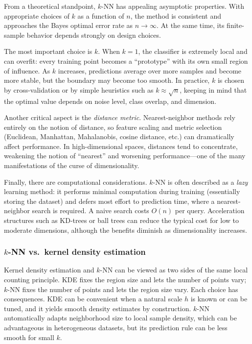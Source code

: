 From a theoretical standpoint, \(k\)-NN has appealing asymptotic properties. With appropriate choices of \(k\) as a function of \(n\), the method is consistent and approaches the Bayes optimal error rate as \(n\to\infty\). At the same time, its finite-sample behavior depends strongly on design choices.

The most important choice is \(k\). When \(k=1\), the classifier is extremely local and can overfit: every training point becomes a ``prototype'' with its own small region of influence. As \(k\) increases, predictions average over more samples and become more stable, but the boundary may become too smooth. In practice, \(k\) is chosen by cross-validation or by simple heuristics such as \(k\approx \sqrt{n}\), keeping in mind that the optimal value depends on noise level, class overlap, and dimension.

Another critical aspect is the \emph{distance metric}. Nearest-neighbor methods rely entirely on the notion of distance, so feature scaling and metric selection (Euclidean, Manhattan, Mahalanobis, cosine distance, etc.) can dramatically affect performance. In high-dimensional spaces, distances tend to concentrate, weakening the notion of ``nearest'' and worsening performance---one of the many manifestations of the curse of dimensionality.

Finally, there are computational considerations. \(k\)-NN is often described as a \emph{lazy} learning method: it performs minimal computation during training (essentially storing the dataset) and defers most effort to prediction time, where a nearest-neighbor search is required. A naive search costs \(O(n)\) per query. Acceleration structures such as KD-trees or ball trees can reduce the typical cost for low to moderate dimensions, although the benefits diminish as dimensionality increases.

\medskip

\subsubsection*{\(k\)-NN vs.\ kernel density estimation}

Kernel density estimation and \(k\)-NN can be viewed as two sides of the same local counting principle. KDE fixes the region size and lets the number of points vary; \(k\)-NN fixes the number of points and lets the region size vary. Each choice has consequences. KDE can be convenient when a natural scale \(h\) is known or can be tuned, and it yields smooth density estimates by construction. \(k\)-NN automatically adapts neighborhood size to local sample density, which can be advantageous in heterogeneous datasets, but its prediction rule can be less smooth for small \(k\).

